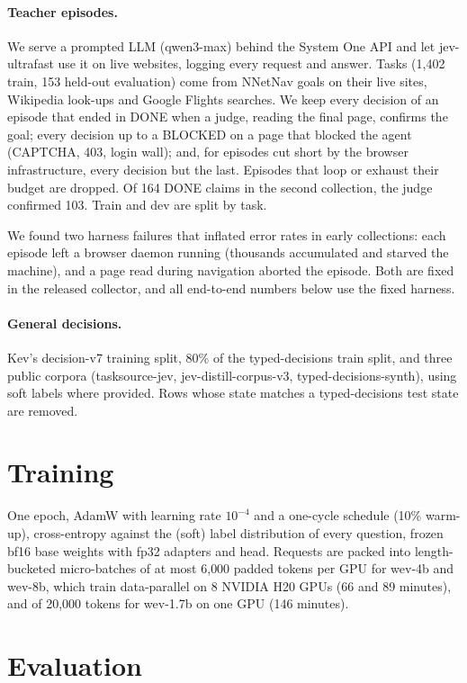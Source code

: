 \documentclass[11pt]{article}
\begin{document}
\paragraph{Teacher episodes.} We serve a prompted LLM (qwen3-max) behind the System One API and let jev-ultrafast use
it on live websites, logging every request and answer. Tasks (1{,}402 train, 153 held-out evaluation) come from
NNetNav goals on their live sites, Wikipedia look-ups and Google Flights searches. We keep every decision of an episode
that ended in DONE when a judge, reading the final page, confirms the goal; every decision up to a BLOCKED on a page
that blocked the agent (CAPTCHA, 403, login wall); and, for episodes cut short by the browser infrastructure, every
decision but the last. Episodes that loop or exhaust their budget are dropped. Of 164 DONE claims in the second
collection, the judge confirmed 103. Train and dev are split by task.

We found two harness failures that inflated error rates in early collections: each episode left a browser daemon
running (thousands accumulated and starved the machine), and a page read during navigation aborted the episode. Both
are fixed in the released collector, and all end-to-end numbers below use the fixed harness.

\paragraph{General decisions.} Kev's decision-v7 training split, 80\% of the typed-decisions train split, and three
public corpora (tasksource-jev, jev-distill-corpus-v3, typed-decisions-synth), using soft labels where provided. Rows
whose state matches a typed-decisions test state are removed.

\section{Training}

One epoch, AdamW with learning rate $10^{-4}$ and a one-cycle schedule (10\% warm-up), cross-entropy against the
(soft) label distribution of every question, frozen bf16 base weights with fp32 adapters and head. Requests are packed
into length-bucketed micro-batches of at most 6{,}000 padded tokens per GPU for wev-4b and wev-8b, which train
data-parallel on 8 NVIDIA H20 GPUs (66 and 89 minutes), and of 20{,}000 tokens for wev-1.7b on one GPU (146 minutes).

\section{Evaluation}
\end{document}

